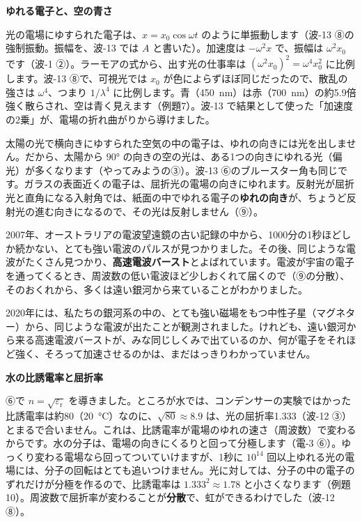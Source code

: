 \noindent\textbf{ゆれる電子と、空の青さ}\par\nobreak
光の電場にゆすられた電子は、$x=x_0\cos\omega t$ のように単振動します（波-13 ⑧の強制振動。振幅を、波-13 では $A$ と書いた）。加速度は $-\omega^2x$ で、振幅は $\omega^2x_0$ です（波-1 ②）。ラーモアの式から、出す光の仕事率は $(\omega^2x_0)^2=\omega^4x_0^2$ に比例します。波-13 ⑧で、可視光では $x_0$ が色によらずほぼ同じだったので、散乱の強さは $\omega^4$、つまり $1/\lambda^4$ に比例します。青（\qty{450}{nm}）は赤（\qty{700}{nm}）の約5.9倍強く散らされ、空は青く見えます（例題7）。波-13 で結果として使った「加速度の2乗」が、電場の折れ曲がりから導けました。

\begin{phmijika}
太陽の光で横向きにゆすられた空気の中の電子は、ゆれの向きには光を出しません。だから、太陽から $90°$ の向きの空の光は、ある1つの向きにゆれる光（偏光）が多くなります（やってみようの③）。波-13 ⑥のブルースター角も同じです。ガラスの表面近くの電子は、屈折光の電場の向きにゆれます。反射光が屈折光と直角になる入射角では、紙面の中でゆれる電子の\textbf{ゆれの向き}が、ちょうど反射光の進む向きになるので、その光は反射しません（⑨）。
\end{phmijika}

\begin{phmada}
2007年、オーストラリアの電波望遠鏡の古い記録の中から、1000分の1秒ほどしか続かない、とても強い電波のパルスが見つかりました。その後、同じような電波がたくさん見つかり、\textbf{高速電波バースト}とよばれています。電波が宇宙の電子を通ってくるとき、周波数の低い電波ほど少しおくれて届くので（⑨の分散）、そのおくれから、多くは遠い銀河から来ていることがわかりました。

2020年には、私たちの銀河系の中の、とても強い磁場をもつ中性子星（マグネター）から、同じような電波が出たことが観測されました。けれども、遠い銀河から来る高速電波バーストが、みな同じしくみで出ているのか、何が電子をそれほど強く、そろって加速させるのかは、まだはっきりわかっていません。
\end{phmada}


\leavevmode\label{ph:電-15:sec9}\noindent\textbf{水の比誘電率と屈折率}\par\nobreak
⑥で $n=\sqrt{\varepsilon_{\mathrm r}}$ を導きました。ところが水では、コンデンサーの実験ではかった比誘電率は約80（\qty{20}{\celsius}）なのに、$\sqrt{80}\approx8.9$ は、光の屈折率1.333（波-12 ③）とまるで合いません。これは、比誘電率が電場のゆれの速さ（周波数）で変わるからです。水の分子は、電場の向きにくるりと回って分極します（電-3 ⑥）。ゆっくり変わる電場なら回ってついていけますが、1秒に $10^{14}$ 回以上ゆれる光の電場には、分子の回転はとても追いつけません。光に対しては、分子の中の電子のずれだけが分極を作るので、比誘電率は $1.333^2\approx1.78$ と小さくなります（例題10）。周波数で屈折率が変わることが\textbf{分散}で、虹ができるわけでした（波-12 ⑧）。

